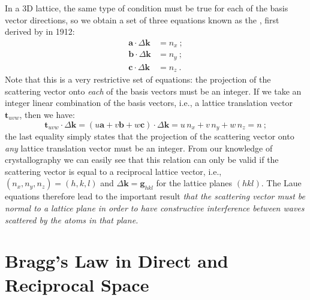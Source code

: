 In a 3D lattice, the same type of condition must be true for each of the basis vector directions, so we obtain a set of three equations known as the , first derived by  in 1912:
\begin{equation}
\begin{split}
	\mathbf{a}\cdot\Delta\mathbf{k}&=n_x\ ;\\
	\mathbf{b}\cdot\Delta\mathbf{k}&=n_y\ ;\\
	\mathbf{c}\cdot\Delta\mathbf{k}&=n_z\ .
\end{split}\label{\chabbr:eq:LaueEq}
\end{equation}
Note that this is a very restrictive set of equations: the projection of the scattering vector onto \textit{each} of the basis vectors must be an integer.  If we take an integer linear combination of the basis vectors, i.e., a lattice translation vector $\mathbf{t}_{uvw}$, then we have:
\[
	\mathbf{t}_{uvw}\cdot\Delta\mathbf{k} = (u\mathbf{a}+v\mathbf{b}+w\mathbf{c})\cdot\Delta\mathbf{k}=u\,n_x+v\,n_y+w\,n_z = n\ ;
\]
the last equality simply states that the projection of the scattering vector onto \textit{any} lattice translation vector must be an integer.  From our knowledge of crystallography we can easily see that this relation can only be valid if the scattering vector is equal to a reciprocal lattice vector, i.e., $(n_x,n_y,n_z)=(h,k,l)$ and $\Delta\mathbf{k}=\mathbf{g}_{hkl}$ for the lattice planes $(hkl)$.  The Laue equations therefore lead to the important result \textit{that the scattering vector must be normal to a lattice plane in order to have constructive interference between waves scattered by the atoms in that plane.}  \\


\section{Bragg's Law in Direct and Reciprocal Space}\label{\chabbr:sec:BraggsLaw}

